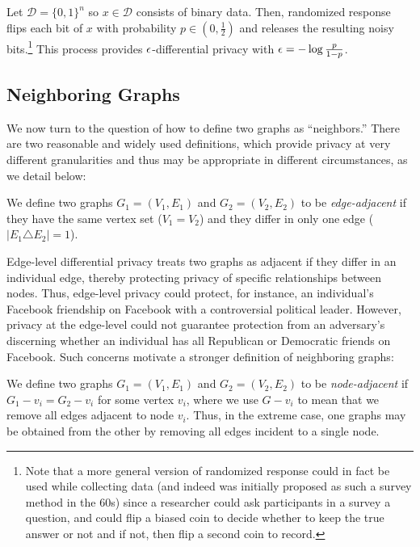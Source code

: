 \begin{theorem}
	Let $\mathcal{D} = \{0,1\}^n$ so $x \in \mathcal{D}$ consists of binary data. Then, randomized response flips each bit of $x$ with probability $p \in (0, \frac{1}{2})$ and releases the resulting noisy bits.\footnote{Note that a more general version of randomized response could in fact be used while collecting data (and indeed was initially proposed as such a survey method in the 60s) since a researcher could ask participants in a survey a question, and could flip a biased coin to decide whether to keep the true answer or not and if not, then flip a second coin to record.} This process provides $\epsilon$-differential privacy with $\epsilon= - \log \frac{p}{1-p}$.
\end{theorem}

\subsection{Neighboring Graphs}

We now turn to the question of how to define two graphs as ``neighbors.'' There are two reasonable and widely used definitions, which provide privacy at very different granularities and thus may be appropriate in different circumstances, as we detail below: 

\begin{definition}
\label{def:edge_level}
We define two graphs $G_1 = (V_1, E_1)$ and $G_2 = (V_2, E_2)$ to be \emph{edge-adjacent} if they have the same vertex set ($V_1 = V_2$) and they differ in only one edge ($\left| E_1 \triangle E_2   \right| = 1$). 
\end{definition}
Edge-level differential privacy treats two graphs as adjacent if they differ in an individual edge, thereby protecting privacy of specific relationships between nodes. Thus, edge-level privacy could protect, for instance, an individual's Facebook friendship on Facebook with a controversial political leader. However, privacy at the edge-level could not guarantee protection from an adversary's discerning whether an individual has all Republican or Democratic friends on Facebook. Such concerns motivate a stronger definition of neighboring graphs:

\begin{definition}
\label{def:node_level}
We define two graphs $G_1 = (V_1, E_1)$ and $G_2 = (V_2, E_2)$ to be \emph{node-adjacent} if $G_1-v_i = G_2-v_i$ for some vertex $v_i$, where we use $G-v_i$ to mean that we remove  all edges adjacent to node $v_i$. Thus, in the extreme case, one graphs may be obtained from the other by removing all edges incident to a single node. 
\end{definition}

